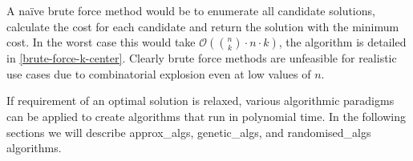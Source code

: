 A na\"ive brute force method would be to enumerate all candidate solutions, calculate the cost for each candidate and return the solution with the minimum cost. In the worst case this would take $\mathcal{O}(\binom{n}{k}\cdot n\cdot k)$, the algorithm is detailed in \cref{brute-force-k-center}. Clearly brute force methods are unfeasible for realistic use cases due to combinatorial explosion even at low values of $n$. 

If requirement of an optimal solution is relaxed, various algorithmic paradigms can be applied to create algorithms that run in polynomial time. In the following sections we will describe \gls{approx_algs}, \gls{genetic_algs}, and \gls{randomised_algs} algorithms.